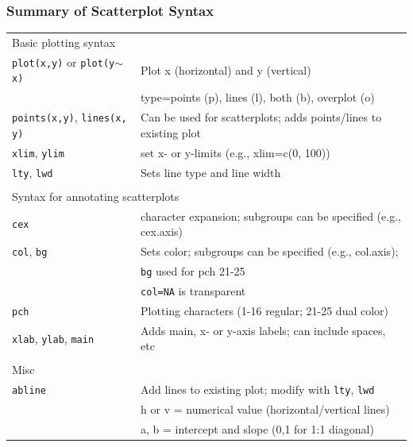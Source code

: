 \documentclass[10pt]{beamer}
\begin{document}
\begin{frame}[fragile]
\frametitle{Summary of Scatterplot Syntax}
\label{scatterplotsyntax}

{\scriptsize
\begin{center}
\begin{tabular}{ll}\hline
\multicolumn{2}{l}{Basic plotting syntax}\\
{\color{red} \tt plot(x,y)} or {\color{red} \tt plot(y$\sim$x)} 
           & Plot x (horizontal) and y (vertical)\\
           & type=points (p), lines (l), both (b), overplot (o)\\
{\color{red} \tt points(x,y)}, {\color{red} \tt lines(x, y)}
           & Can be used for scatterplots; adds points/lines to existing plot\\
{\color{red} \tt xlim}, {\color{red} \tt ylim}
        & set x- or y-limits (e.g., xlim=c(0, 100))\\
{\color{red} \tt lty}, {\color{red} \tt lwd} & Sets line type and line width\\
           & \\
\multicolumn{2}{l}{Syntax for annotating scatterplots}\\
{\color{red} \tt cex}
        & character expansion; subgroups can be specified (e.g., cex.axis)\\
{\color{red} \tt col}, {\color{red} \tt bg} 
        & Sets color; subgroups can be specified (e.g., col.axis);\\
        & {\color{red} \tt bg} used for pch 21-25 \\
        & {\color{red} \tt col=NA} is transparent\\
{\color{red} \tt pch} & Plotting characters (1-16 regular; 21-25 dual color)\\
{\color{red} \tt xlab}, {\color{red} \tt ylab}, {\color{red} \tt main} 
        & Adds main, x- or y-axis labels; can include spaces, etc\\
                 & \\
\multicolumn{2}{l}{Misc}\\
{\color{red} \tt abline} & Add lines to existing plot; 
        modify with {\color{red} \tt lty}, {\color{red} \tt lwd}\\
                 & \hspace{2ex} h or v = numerical value (horizontal/vertical lines)\\
                 & \hspace{2ex} a, b = intercept and slope (0,1 for 1:1 diagonal)\\

\end{tabular}
\end{center}}
\end{frame}
\end{document}
